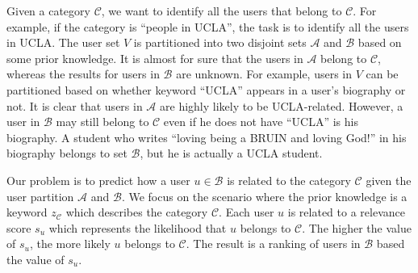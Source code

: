 \documentclass{article}
\begin{document}
Given a category $\mathcal{C}$, we want to identify all the users that belong to $\mathcal{C}$. For example, if the category is ``people in UCLA'', the task is to identify all the users in UCLA. The user set $V$ is partitioned into two disjoint sets $\mathcal{A}$ and $\mathcal{B}$ based on some prior knowledge. It is almost for sure that the users in $\mathcal{A}$ belong to $\mathcal{C}$, whereas the results for users in $\mathcal{B}$ are unknown. For example, users in $V$ can be partitioned based on whether keyword ``UCLA'' appears in a user's biography or not. It is clear that users in $\mathcal{A}$ are highly likely to be UCLA-related. However, a user in $\mathcal{B}$ may still belong to $\mathcal{C}$ even if he does not have ``UCLA'' is his biography. A student who writes ``loving being a BRUIN and loving God!'' in his biography belongs to set $\mathcal{B}$, but he is actually a UCLA student.


Our problem is to predict how a user $u \in \mathcal{B}$ is related to the category $\mathcal{C}$ given the user partition $\mathcal{A}$ and $\mathcal{B}$. We focus on the scenario where the prior knowledge is a keyword $z_{\mathcal{C}}$ which describes the category $\mathcal{C}$. Each user $u$ is related to a relevance score $s_u$ which represents the likelihood that $u$ belongs to $\mathcal{C}$. The higher the value of $s_u$, the more likely $u$ belongs to $\mathcal{C}$. The result is a ranking of users in $\mathcal{B}$ based the value of $s_u$.


\ifx \allfiles \undefined
\end{document}

